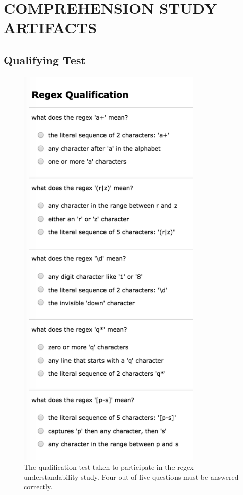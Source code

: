 \chapter{COMPREHENSION STUDY ARTIFACTS}

\section*{Qualifying Test}
\label{app:MTqualifyingTest}

\begin{figure}[tb]
\centering
\includegraphics[height=20cm,keepaspectratio]{nontex/qualificationTest}
\vspace{-12pt}
\caption{The qualification test taken to participate in the regex understandability study.  Four out of five questions must be answered correctly.}
\vspace{-6pt}
\label{fig:qualTest}
\end{figure}

